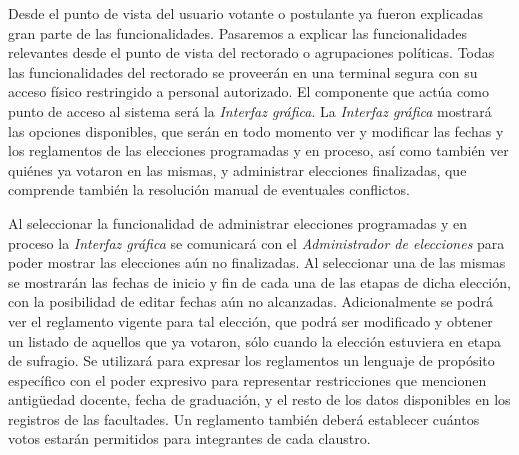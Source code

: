 


Desde el punto de vista del usuario votante o postulante ya fueron explicadas gran parte de las funcionalidades. Pasaremos a explicar las funcionalidades relevantes desde el punto de vista del rectorado o agrupaciones políticas. 
Todas las funcionalidades del rectorado se proveerán en una terminal segura con su acceso físico restringido a personal autorizado. El componente que actúa como punto de acceso al sistema será la \emph{Interfaz gráfica}. 
La \emph{Interfaz gráfica} mostrará las opciones disponibles, que serán en todo momento ver y modificar las fechas y los reglamentos de las elecciones programadas y en proceso, así como también ver quiénes ya votaron en las mismas, y administrar elecciones finalizadas, que comprende también la resolución manual de eventuales conflictos.


Al seleccionar la funcionalidad de administrar elecciones programadas y en proceso la \emph{Interfaz gráfica} se comunicará con el \emph{Administrador de elecciones} para poder mostrar las elecciones aún no finalizadas. Al seleccionar una de las mismas se mostrarán las fechas de inicio y fin de cada una de las etapas de dicha elección, con la posibilidad de editar fechas aún no alcanzadas. Adicionalmente se podrá ver el reglamento vigente para tal elección, que podrá ser modificado y obtener un listado de aquellos que ya votaron, sólo cuando la elección estuviera en etapa de sufragio. Se utilizará para expresar los reglamentos un lenguaje de propósito específico con el poder expresivo para representar restricciones que mencionen antig\"uedad docente, fecha de graduación, y el resto de los datos disponibles en los registros de las facultades. Un reglamento también deberá establecer cuántos votos estarán permitidos para integrantes de cada claustro.


